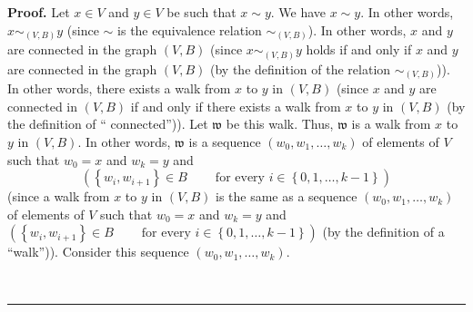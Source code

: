 \documentclass[numbers=enddot,12pt,final,onecolumn,notitlepage]{scrartcl}%
\theoremstyle{definition}
\newenvironment{proof}[1][Proof]{\noindent\textbf{#1.} }{\ \rule{0.5em}{0.5em}}
\newenvironment{verlong}{}{}
\begin{document}
\begin{verlong}
\begin{proof}
Let $x\in V$ and $y\in V$ be such that $x\sim y$. We have $x\sim y$. In other
words, $x\sim_{\left(  V,B\right)  }y$ (since $\sim$ is the equivalence
relation $\sim_{\left(  V,B\right)  }$). In other words, $x$ and $y$ are
connected in the graph $\left(  V,B\right)  $ (since $x\sim_{\left(
V,B\right)  }y$ holds if and only if $x$ and $y$ are connected in the graph
$\left(  V,B\right)  $ (by the definition of the relation $\sim_{\left(
V,B\right)  }$)). In other words, there exists a walk from $x$ to $y$ in
$\left(  V,B\right)  $ (since $x$ and $y$ are connected in $\left(
V,B\right)  $ if and only if there exists a walk from $x$ to $y$ in $\left(
V,B\right)  $ (by the definition of \textquotedblleft
connected\textquotedblright)). Let $\mathfrak{w}$ be this walk. Thus,
$\mathfrak{w}$ is a walk from $x$ to $y$ in $\left(  V,B\right)  $. In other
words, $\mathfrak{w}$ is a sequence $\left(  w_{0},w_{1},\ldots,w_{k}\right)
$ of elements of $V$ such that $w_{0}=x$ and $w_{k}=y$ and%
\begin{equation}
\left(  \left\{  w_{i},w_{i+1}\right\}  \in B\ \ \ \ \ \ \ \ \ \ \text{for
every }i\in\left\{  0,1,\ldots,k-1\right\}  \right)
\label{pf.lem.Eqs.sum.im1.pf.1}%
\end{equation}
(since a walk from $x$ to $y$ in $\left(  V,B\right)  $ is the same as a
sequence $\left(  w_{0},w_{1},\ldots,w_{k}\right)  $ of elements of $V$ such
that $w_{0}=x$ and $w_{k}=y$ and $\left(  \left\{  w_{i},w_{i+1}\right\}  \in
B\ \ \ \ \ \ \ \ \ \ \text{for every }i\in\left\{  0,1,\ldots,k-1\right\}
\right)  $ (by the definition of a \textquotedblleft walk\textquotedblright)).
Consider this sequence $\left(  w_{0},w_{1},\ldots,w_{k}\right)  $.


\end{proof}
\end{verlong}
\end{document}
